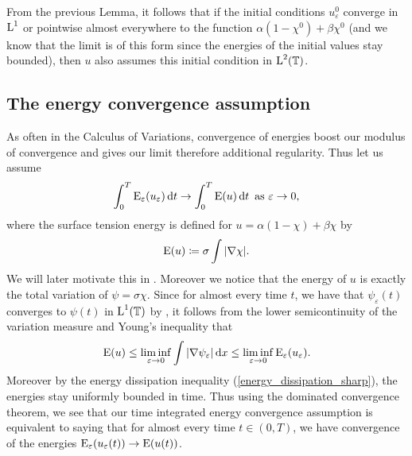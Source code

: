 \begin{remark}
	From the previous Lemma, it follows that if the initial conditions $ u_{ \varepsilon }^{ 0 } $ converge in $ \operatorname{L}^{ 1 } $ or pointwise almost everywhere to the function $ \alpha ( 1 - \chi^{ 0 } ) + \beta \chi^{ 0 } $ (and we know that the limit is of this form since the energies of the initial values stay bounded), then $ u $ also assumes this initial condition in $ \operatorname{L}^{ 2 } ( \operatorname{\mathbb{T}} ) $.
\end{remark}

\subsection{The energy convergence assumption}

As often in the Calculus of Variations, convergence of energies boost our modulus of convergence and gives our limit therefore additional regularity. 
Thus let us assume 
\begin{equation}
	\label{energy_convergence}
	\int_{ 0 }^{ T }
	\operatorname{E}_{ \varepsilon } ( u_{ \varepsilon } ) 
	\dd{ t }
	\to 
	\int_{ 0 }^{ T }
	\operatorname{E} ( u )
	\dd{ t }
	\text{ as }
	\varepsilon \to 0,
\end{equation}
where the surface tension energy is defined for $ u = \alpha ( 1 - \chi ) + \beta \chi $ by 
\begin{equation}
	\operatorname{E} ( u ) 
	\coloneqq
	\sigma \int \abs{ \nabla \chi }.
\end{equation}
We will later motivate this in .
Moreover we notice that the energy of $ u $ is exactly the total variation of $ \psi = \sigma \chi $.
Since for almost every time $ t $, we have that $ \psi_{ \varepsilon } ( t ) $ converges to $ \psi ( t ) $ in $ \operatorname{L}^{ 1 }  ( \operatorname{\mathbb{T}} ) $ by , it follows from the lower semicontinuity of the variation measure and Young's inequality that
\begin{equation*}
	\operatorname{E} ( u ) 
	\leq
	\liminf_{ \varepsilon \to 0 }
	\int
	\abs{ \nabla \psi_{ \varepsilon } }
	\dd{ x }
	\leq
	\liminf_{ \varepsilon \to 0 }
	\operatorname{E}_{ \varepsilon } ( u_{ \varepsilon } ).
\end{equation*}
Moreover by the energy dissipation inequality (\ref{energy_dissipation_sharp}), the energies stay uniformly bounded in time. Thus using the dominated convergence theorem, we see that our time integrated energy convergence assumption is equivalent to saying that for almost every time $ t \in ( 0, T ) $, we have convergence of the energies $ \operatorname{E}_{ \varepsilon } ( u_{ \varepsilon } ( t ) ) \to \operatorname{E} ( u ( t ) ) $.

